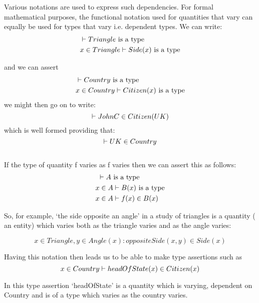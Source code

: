 \documentclass[10pt,a4paper]{article}
\begin{document}
\noindent Various notations are used to express such dependencies. For formal
mathematical purposes, the functional
notation used for quantities that vary can equally be used for types that vary i.e. dependent types. We can write:
\begin{align*}
&\vdash Triangle\mbox{ is a type} \\
&x \in Triangle \vdash Side(x)\mbox{ is a type} 
\end{align*}  

\noindent and we can assert
\begin{align*}
&\vdash Country\mbox{ is a type} \\
&x \in Country \vdash Citizen(x) \mbox{ is a type}
\end{align*}
\noindent we might then go on to write: 
\begin{equation*}
\vdash JohnC \in Citizen(UK)
\end{equation*}
which is well formed providing that:
\begin{equation*}
\vdash UK \in Country
\end{equation*}
\\


\noindent If the type of quantity f varies as f varies then we can assert this as follows: \\
\begin{align*}
&\text{                                  }\vdash A\mbox{ is a type} \\
&x \in A \vdash B(x)\mbox{ is a type} \\
&x \in A \vdash f(x) \in B(x) 
\end{align*}


\noindent So, for example, `the side opposite an angle' in a study of triangles is a quantity ( an entity)  which varies both as the triangle varies and as the angle varies:

\begin{equation*}
x \in Triangle, y \in Angle(x): oppositeSide(x,y) \in Side(x)
\end{equation*}

\noindent Having this notation then leads us to be able to make type assertions such as
\begin{equation*}
x \in Country \vdash headOfState(x) \in Citizen(x)
\end{equation*}

\noindent In this type assertion `headOfState' is a quantity which is varying, dependent on Country and is of a type which varies as the country varies.\\
\end{document}
